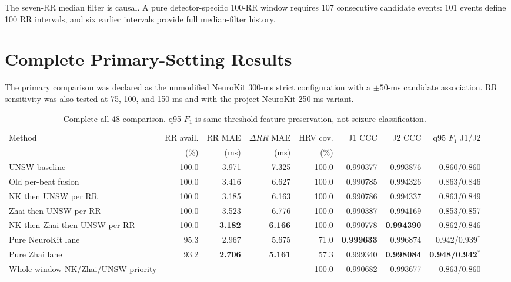 \documentclass[10pt]{article}
\begin{document}
The seven-RR median filter is causal. A pure detector-specific 100-RR window
requires 107 consecutive candidate events: 101 events define 100 RR intervals,
and six earlier intervals provide full median-filter history.

\section{Complete Primary-Setting Results}

The primary comparison was declared as the unmodified NeuroKit 300-ms strict
configuration with a $\pm50$-ms candidate association. RR sensitivity was also
tested at 75, 100, and 150 ms and with the project NeuroKit 250-ms variant.

\begin{table}[H]
\centering
\caption{Complete all-48 comparison. q95 $F_1$ is same-threshold feature
preservation, not seizure classification.}
\begin{adjustbox}{max width=\linewidth}
\begin{tabular}{lrrrrrrr}
\toprule
Method & RR avail. & RR MAE & $\Delta RR$ MAE & HRV cov. & J1 CCC & J2 CCC & q95 $F_1$ J1/J2 \\
 & (\%) & (ms) & (ms) & (\%) & & & \\
\midrule
UNSW baseline & 100.0 & 3.971 & 7.325 & 100.0 & 0.990377 & 0.993876 & 0.860/0.860 \\
Old per-beat fusion & 100.0 & 3.416 & 6.627 & 100.0 & 0.990785 & 0.994326 & 0.863/0.846 \\
NK then UNSW per RR & 100.0 & 3.185 & 6.163 & 100.0 & 0.990786 & 0.994337 & 0.863/0.849 \\
Zhai then UNSW per RR & 100.0 & 3.523 & 6.776 & 100.0 & 0.990387 & 0.994169 & 0.853/0.857 \\
\rowcolor{lightblue}NK then Zhai then UNSW per RR & 100.0 & \textbf{3.182} & \textbf{6.166} & 100.0 & 0.990778 & \textbf{0.994390} & 0.862/0.846 \\
Pure NeuroKit lane & 95.3 & 2.967 & 5.675 & 71.0 & \textbf{0.999633} & 0.996874 & 0.942/0.939$^{*}$ \\
Pure Zhai lane & 93.2 & \textbf{2.706} & \textbf{5.161} & 57.3 & 0.999340 & \textbf{0.998084} & \textbf{0.948/0.942}$^{*}$ \\
Whole-window NK/Zhai/UNSW priority & -- & -- & -- & 100.0 & 0.990682 & 0.993677 & 0.863/0.860 \\
\bottomrule
\end{tabular}
\end{adjustbox}
\end{table}
\end{document}
